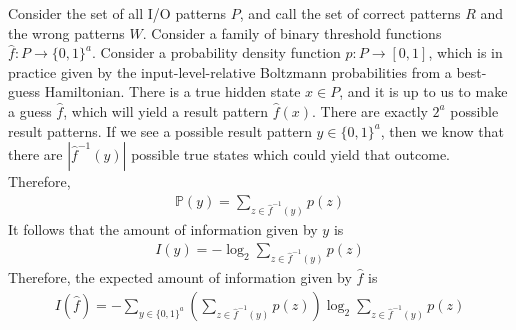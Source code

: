 \documentclass{article}
\begin{document}
Consider the set of all I/O patterns $P$, and call the set of correct patterns $R$ and the wrong patterns $W$. Consider a family of binary threshold functions $\hat{f} : P \rightarrow \{0,1\}^a$. Consider a probability density function $p : P \rightarrow [0,1]$, which is in practice given by the input-level-relative Boltzmann probabilities from a best-guess Hamiltonian. There is a true hidden state $x \in P$, and it is up to us to make a guess $\hat{f}$, which will yield a result pattern $\hat{f}(x)$. There are exactly $2^a$ possible result patterns. If we see a possible result pattern $y \in \{0,1\}^a$, then we know that there are $|\hat{f}^{-1}(y)|$ possible true states which could yield that outcome. Therefore,
\begin{align}
	\mathbb{P}(y) = \sum_{z \in \hat{f}^{-1}(y)} p(z) 
\end{align}
It follows that the amount of information given by $y$ is
\begin{align}
	I(y) = -\log_2\sum_{z \in \hat{f}^{-1}(y)} p(z)
\end{align}
Therefore, the expected amount of information given by $\hat{f}$ is 
\begin{align}
	I(\hat{f}) = -\sum_{y \in \{0,1\}^a} \left(\sum_{z \in \hat{f}^{-1} (y)} p(z)\right) \log_2 \sum_{z \in \hat{f}^{-1}(y)} p(z)
\end{align}
\end{document}
